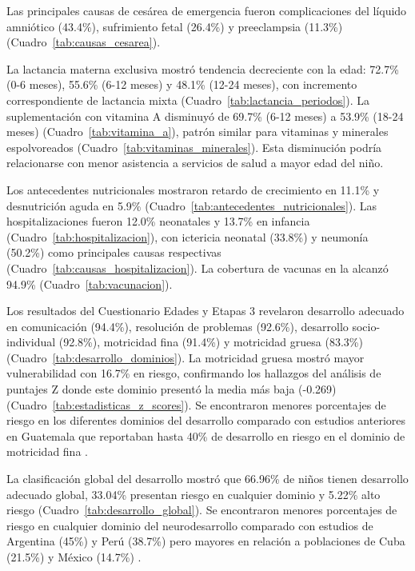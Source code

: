 \documentclass[11pt,letterpaper]{report}
\begin{document}
Las principales causas de cesárea de emergencia fueron complicaciones del 
líquido amniótico (43.4\%), sufrimiento fetal (26.4\%) y preeclampsia (11.3\%) 
(Cuadro~\ref{tab:causas_cesarea}).

La lactancia materna exclusiva mostró tendencia decreciente con la edad: 72.7\% 
(0-6 meses), 55.6\% (6-12 meses) y 48.1\% (12-24 meses), con incremento 
correspondiente de lactancia mixta (Cuadro~\ref{tab:lactancia_periodos}). La 
suplementación con vitamina A disminuyó de 69.7\% (6-12 meses) a 53.9\% 
(18-24 meses) (Cuadro~\ref{tab:vitamina_a}), patrón similar para vitaminas y 
minerales espolvoreados (Cuadro~\ref{tab:vitaminas_minerales}). Esta 
disminución podría relacionarse con menor asistencia a servicios de salud a 
mayor edad del niño.

Los antecedentes nutricionales mostraron retardo de crecimiento en 11.1\% y 
desnutrición aguda en 5.9\% (Cuadro~\ref{tab:antecedentes_nutricionales}). 
Las hospitalizaciones fueron 12.0\% neonatales y 13.7\% en infancia 
(Cuadro~\ref{tab:hospitalizacion}), con ictericia neonatal (33.8\%) y neumonía 
(50.2\%) como principales causas respectivas 
(Cuadro~\ref{tab:causas_hospitalizacion}). La cobertura de vacunas en la alcanzó
94.9\% (Cuadro~\ref{tab:vacunacion}).

Los resultados del Cuestionario Edades y Etapas 3 revelaron desarrollo adecuado
en comunicación (94.4\%),  resolución de problemas (92.6\%), desarrollo
socio-individual (92.8\%),  motricidad fina (91.4\%) y motricidad gruesa
(83.3\%)  (Cuadro~\ref{tab:desarrollo_dominios}). La motricidad gruesa mostró
mayor  vulnerabilidad con 16.7\% en riesgo, confirmando los hallazgos del
análisis de puntajes Z donde este dominio presentó la media más baja (-0.269) 
(Cuadro~\ref{tab:estadisticas_z_scores}). Se encontraron menores porcentajes de riesgo en los diferentes dominios del desarrollo comparado con estudios anteriores en Guatemala que reportaban hasta 40\% de desarrollo en riesgo en el dominio de motricidad fina \cite{Angulo2023}.

La clasificación global del desarrollo mostró que 66.96\% de niños tienen 
desarrollo adecuado global, 33.04\% presentan riesgo en cualquier dominio y 
5.22\% alto riesgo (Cuadro~\ref{tab:desarrollo_global}). Se encontraron menores porcentajes de riesgo en cualquier dominio del neurodesarrollo comparado con estudios de Argentina (45\%) y Perú (38.7\%) pero mayores en relación a poblaciones de Cuba (21.5\%) y México (14.7\%)
\cite{GuadarramaCelaya2011,Kyerematen2014,CarlosOliva2020,RicardoGarcell2022}.
\end{document}
